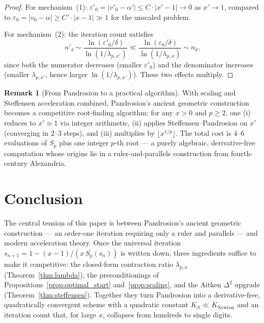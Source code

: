 \documentclass[11pt,a4paper]{article}
\theoremstyle{definition}
\newtheorem{remark}{Remark}[section]
\newcommand{\eps}{\varepsilon}
\begin{document}
\begin{proof}
For mechanism~(1): $\eps'_0 = |v'_0 - \alpha'| \leq C \cdot |x' - 1| \to 0$ as $x' \to 1$, compared to $\eps_0 = |v_0 - \alpha| \geq C' \cdot |x - 1| \gg 1$ for the unscaled problem.

For mechanism~(2): the iteration count satisfies
\[
  n'_\delta \sim \frac{\ln(\eps'_0/\delta)}{\ln(1/\lambda_{p,x'})} \ll \frac{\ln(\eps_0/\delta)}{\ln(1/\lambda_{p,x})} \sim n_\delta,
\]
since both the numerator decreases (smaller $\eps'_0$) and the denominator increases (smaller $\lambda_{p,x'}$, hence larger $\ln(1/\lambda_{p,x'})$). These two effects multiply.
\end{proof}

\begin{remark}[From Pandrosion to a practical algorithm]
With scaling and Steffensen acceleration combined, Pandrosion's ancient geometric construction becomes a competitive root-finding algorithm: for any $x > 0$ and $p \geq 2$, one (i) reduces to $x' \approx 1$ via integer arithmetic, (ii) applies Steffensen--Pandrosion on $x'$ (converging in $2$--$3$ steps), and (iii) multiplies by $\lfloor x^{1/p} \rfloor$. The total cost is $4$--$6$ evaluations of $S_p$ plus one integer $p$-th root --- a purely algebraic, derivative-free computation whose origins lie in a ruler-and-parallels construction from fourth-century Alexandria.
\end{remark}

\section{Conclusion}
\label{sec:conclusion}

The central tension of this paper is between Pandrosion's ancient geometric construction — an order-one iteration requiring only a ruler and parallels — and modern acceleration theory. Once the universal iteration $s_{n+1} = 1 - (x-1)/(x\,S_p(s_n))$ is written down, three ingredients suffice to make it competitive: the closed-form contraction ratio $\lambda_{p,x}$ (Theorem~\ref{thm:lambda}), the preconditionings of Propositions~\ref{prop:optimal_start} and~\ref{prop:scaling}, and the Aitken $\Delta^2$ upgrade (Theorem~\ref{thm:steffensen}). Together they turn Pandrosion into a derivative-free, quadratically convergent scheme with a quadratic constant $K_S \ll K_{\text{Newton}}$ and an iteration count that, for large $x$, collapses from hundreds to single digits.
\end{document}
